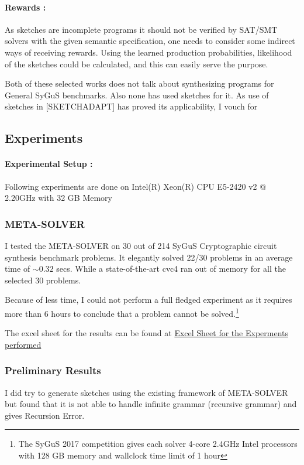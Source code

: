 \paragraph{Rewards :}
As sketches are incomplete programs it should not be verified by SAT/SMT solvers with the given semantic specification, one needs to consider some indirect ways of receiving rewards. Using the learned production probabilities, likelihood of the sketches could be calculated, and this can easily serve the purpose.


Both of these selected works does not talk about synthesizing programs for General SyGuS benchmarks. Also none has used sketches for it. As use of sketches in [SKETCHADAPT] has proved its applicability, I vouch for 

\subsection{Experiments}
\label{others}

\paragraph{Experimental Setup :}
Following experiments are done on Intel(R) Xeon(R) CPU E5-2420 v2 @ 2.20GHz with 32 GB Memory

\subsubsection{META-SOLVER}
I tested the META-SOLVER on 30 out of 214 SyGuS Cryptographic circuit synthesis benchmark problems. It elegantly solved 22/30 problems in an average time of $\sim0.32$ secs. While a state-of-the-art cvc4 ran out of memory for all the selected 30 problems. 

Because of less time, I could not perform a full fledged experiment as it requires more than 6 hours to conclude that a problem cannot be solved.\footnote{The SyGuS 2017 competition gives each solver 4-core 2.4GHz Intel processors with 128 GB memory and
wallclock time limit of 1 hour}

The excel sheet for the results can be found at \href{https://indianinstituteofscience-my.sharepoint.com/:x:/g/personal/raviraja_iisc_ac_in/EU-Um2g9igVJk5XrmXZoL1IBR_DlPHCtAWpxcVPZtu4n_Q?e=Krd9t5}{Excel Sheet for the Experments performed}

\subsubsection{Preliminary Results}
I did try to generate sketches using the existing framework of META-SOLVER but found that it is not able to handle infinite grammar (recursive grammar) and gives Recursion Error.

